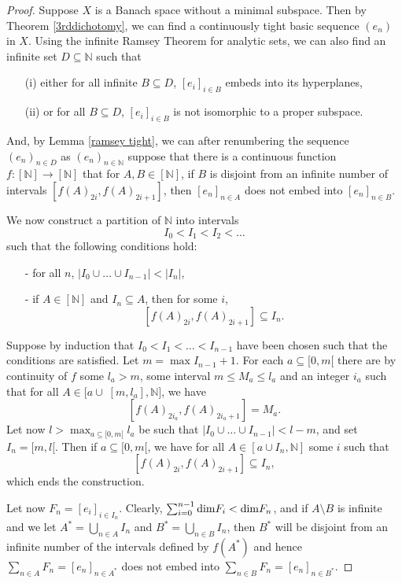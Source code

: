 \documentclass[10pt]{amsart}
\numberwithin{equation}{section}
\begin{document}
\begin{proof}
Suppose $X$ is a Banach space without a minimal subspace. Then by Theorem
\ref{3rddichotomy}, we can find a continuously tight basic sequence $(e_n)$ in
$X$. Using the infinite Ramsey Theorem for analytic sets, we can also find an
infinite set $D\subseteq {\mathbb N}$ such that
\begin{itemize}
  \item[(i)] either for all infinite $B\subseteq D$, $[e_i]_{i\in B}$ embeds into its hyperplanes,
  \item[(ii)] or for all $B\subseteq D$, $[e_i]_{i\in B}$ is not isomorphic to a proper  subspace.
\end{itemize}
And, by Lemma \ref{ramsey tight},  we can after renumbering the sequence
$(e_n)_{n\in D}$ as $(e_n)_{n\in {\mathbb N}}$ suppose that  there is a continuous
function $f\colon [{\mathbb N}]{\rightarrow} [{\mathbb N}]$ that for $A, B\in [{\mathbb N}]$, if $B$ is disjoint
from an infinite number of intervals $[f(A)_{2i},f(A)_{2i+1}]$, then
$[e_n]_{n\in A}$ does not embed into $[e_n]_{n\in B}$.

We now construct a partition of ${\mathbb N}$ into intervals
$$
I_0<I_1<I_2<\ldots
$$
such that the following conditions hold:
\begin{itemize}
  \item[-] for all $n$, $|I_0\cup\ldots \cup I_{n-1}|<|I_n|$,
  \item[-] if  $A\in [{\mathbb N}]$ and $I_n\subseteq A$, then for some $i$,
$$
[f(A)_{2i},f(A)_{2i+1}]\subseteq I_n.
$$
\end{itemize}
Suppose by induction that $I_0<I_1<\ldots<I_{n-1}$ have been chosen such that
the conditions are satisfied. Let $m=\max I_{n-1}+1$. For each $a\subseteq
[0,m[$ there are by continuity of $f$  some $l_a>m$, some interval $m{\ensuremath{\leqslant}}
M_a{\ensuremath{\leqslant}} l_a$ and an integer $i_a$ such that for all $A\in \big[a\cup\;
[m,l_a],{\mathbb N}\big]$, we have
$$
[f(A)_{2i_a},f(A)_{2i_a+1}]=M_a.
$$
Let now $l> \max_{a\subseteq [0,m[}l_a$ be such that $|I_0\cup\ldots \cup
I_{n-1}|<l-m$, and set $I_n=[m,l[$. Then if  $a\subseteq[0,m[$, we have for all
$A\in [a\cup I_n,{\mathbb N}]$ some $i$ such that
$$
[f(A)_{2i},f(A)_{2i+1}]\subseteq I_n,
$$
which ends the construction.

Let now $F_n=[e_i]_{i\in I_n}$. Clearly,  $\sum_{i=0}^{n-1}{\rm dim}F_i<{\rm
dim}F_n$, and if $A\setminus B$ is infinite and we let $A^*=\bigcup_{n\in A}
I_n$ and $B^*=\bigcup_{n\in B}I_n$, then $B^*$ will be disjoint from an
infinite number of the intervals defined by $f(A^*)$ and hence $\sum_{n\in
A}F_n=[e_n]_{n\in A^*}$ does not embed into $\sum_{n\in B}F_n=[e_n]_{n\in
B^*}$.


\end{proof}
\end{document}
